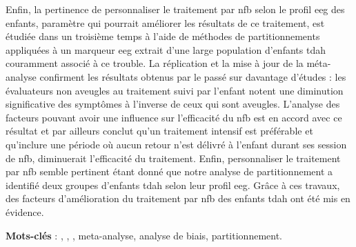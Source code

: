 Enfin, la pertinence de personnaliser le traitement par \gls{nfb} selon le profil \gls{eeg} des enfants, paramètre qui pourrait améliorer les résultats de ce traitement, est étudiée dans un troisième
temps à l'aide de méthodes de partitionnements appliquées à un marqueur \gls{eeg} extrait d'une large population d'enfants \gls{tdah} couramment associé à ce trouble. 
La réplication et la mise à jour de la méta-analyse confirment les résultats obtenus par le passé sur davantage d'études : les évaluateurs non aveugles au traitement suivi par 
l'enfant notent une diminution significative des symptômes à l'inverse de ceux qui sont aveugles. L'analyse des facteurs pouvant avoir une influence sur l'efficacité du \gls{nfb}
est en accord avec ce résultat et par ailleurs conclut qu'un traitement intensif est préférable et qu'inclure une période où aucun retour n'est délivré à l'enfant durant ses session de \gls{nfb},
diminuerait l'efficacité du traitement. Enfin, personnaliser le traitement par \gls{nfb} semble pertinent étant donné que notre analyse de partitionnement a identifié deux groupes
d'enfants \gls{tdah} selon leur profil \gls{eeg}.
Grâce à ces travaux, des facteurs d'amélioration du traitement par \gls{nfb} des enfants \gls{tdah} ont été mis en évidence. 



\large{\textbf{Mots-clés}} : , , , meta-analyse, analyse de biais, partitionnement.